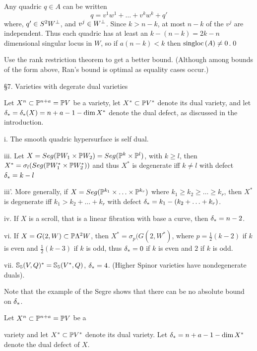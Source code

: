 Any quadric $q\in A$ can be written
$$
q= v^1w^1+\hdots + v^kw^k + q'
$$
where,   $q'\in S^2W{}^{\perp}$,
and $v^j\in W{}^{\perp}$. Since $k>n-k$, at most 
$n-k$ of the $v^j$ are independent.
Thus each quadric has at least an
$k-(n-k)=2k-n$ dimensional singular locus in $W$, so
if $a(n-k)<k$ then $\text{singloc}\, (A)\neq 0$.\qed\enddemo 

 Use the rank restriction theorem to get a
better bound. (Although among bounds of the form above, Ran's bound is
optimal as equality cases occur.)
 
 
\heading\S 7. Varieties with degerate dual varieties\endheading

 

Let $X^n\subset\Bbb P^{n+a}=\Bbb P V$ be a variety,
let $X^*\subset\Bbb P V^*$ denote its dual variety, and let
$\delta_{*} = \delta_{*} (X) = n+a-1-\text{dim}\, X^*$ denote the dual defect,
as discussed in the introduction.


i. The smooth quadric hypersurface is self dual.



iii. Let $X= Seg(\Bbb P W_1\times\Bbb P W_2)=
Seg(\Bbb P^{k}\times\Bbb P^{l})$, with $k\geq l$,
 then $X^*=\sigma_{l}(Seg(\Bbb P
W_1^*\times\Bbb P W_2^*))$ and thus $X^*$ is degenerate iff $k\neq l$
with defect $\delta_{*} = k-l$

iii'. More generally, if $X=Seg(\Bbb P^{k_1}\times\hdots\times\Bbb P^{k_r})$
where $k_1\geq k_2\geq\hdots\geq k_r$, then $X^*$ is degenerate
iff $k_1> k_2+\hdots +k_r$
with defect $\delta_{*} = k_1-( k_2+\hdots +k_r)$.

iv. If $X$ is a scroll, that is a linear fibration
with base a curve, then $\delta_{*}= n-2$.


vi. If $X=G(2,W)\subset\Bbb P\Lambda^{2} W$, then 
$X^*=\sigma_p(G(2,W^*)$, where
$p=\frac 12(k-2)$ if $k$ is even and $\frac 12(k-3)$ if $k$ is odd, thus
$\delta_{*}= 0$ if $k$ is even
and $2$ if $k$ is odd.  

vii. $\Bbb S_5(V,Q)^*=\Bbb S_5(V^*,Q)$,  $\delta_{*} =4$. (Higher
Spinor varieties have nondegenerate duals).

Note that the example of the Segre shows that there can be
no absolute bound on $\delta_{*}$. 

 Let $X^n\subset\Bbb P^{n+a}=\Bbb P V$ be a

  variety and let $X^*\subset\Bbb P V^*$
denote its dual variety. Let $\delta_{*}= n+a-1-\text{dim}\, X^*$ denote
the dual defect of $X$.   

